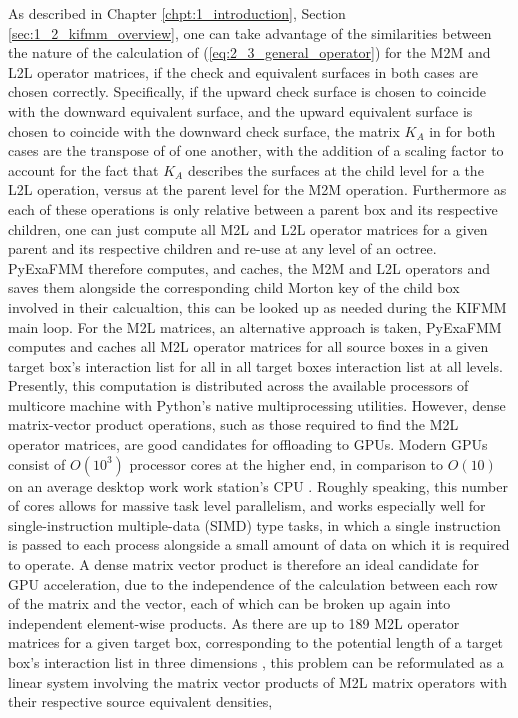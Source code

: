 As described in Chapter \ref{chpt:1_introduction}, Section \ref{sec:1_2_kifmm_overview}, one
can take advantage of the similarities between the nature of the calculation of
(\ref{eq:2_3_general_operator}) for the \gls{M2M} and \gls{L2L} operator matrices, if
the check and equivalent surfaces in both cases are chosen correctly. Specifically,
if the upward check surface is chosen to coincide with the downward equivalent
surface, and the upward equivalent surface is chosen to coincide with the
downward check surface, the matrix $K_A$ in for both cases are the transpose of
of one another, with the addition of a scaling factor to account for the fact
that $K_A$ describes the surfaces at the child level for a the \gls{L2L} operation,
versus at the parent level for the \gls{M2M} operation. Furthermore as each of these
operations is only relative between a parent box and its respective children, one
can just compute all M2L and L2L operator matrices for a given parent and its
respective children and re-use at any level of an octree. \gls{PyExaFMM} therefore
computes, and caches, the M2M and L2L operators and saves them alongside the
corresponding child Morton \gls{key} of the child box involved in their calcualtion,
 this can be looked up as needed during the \gls{KIFMM} main loop. For the M2L
 matrices, an alternative approach is taken, \gls{PyExaFMM} computes
and caches all M2L operator matrices for all source boxes in a given target box's
interaction list for all in all target boxes
interaction list at all levels. Presently, this computation is distributed across
the available processors of multicore machine
with Python's native multiprocessing utilities. However, dense matrix-vector
product operations, such as those required to find the \gls{M2L} operator
matrices, are good candidates for offloading to \gls{GPU}s. Modern \gls{GPU}s
consist of $O(10^3)$ processor cores at the higher end,
in comparison to $O(10)$ on an average desktop work work station's CPU
\cite{Hwu:2011:MKP}. Roughly speaking, this number of cores allows for massive task level parallelism,
and works especially well for single-instruction multiple-data (\gls{SIMD}) type tasks, in which
a single instruction is passed to each process alongside a small amount of data on which it
is required to operate. A dense matrix vector product is therefore an ideal
candidate for GPU acceleration, due to the independence of the calculation between each row
of the matrix and the vector, each of which can be broken up again into independent element-wise
products. As there are up to 189 M2L operator matrices for a given
target box, corresponding to the potential length of a target box's interaction
list in three dimensions \cite{Ying:2004:JCP}, this problem can be reformulated
as a linear system involving the matrix vector products of M2L matrix operators
with their respective source equivalent densities,

